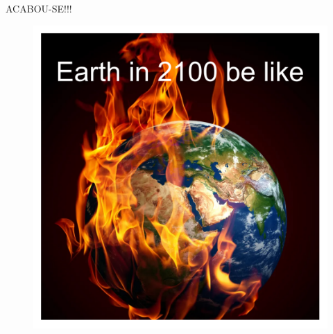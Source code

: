 \documentclass{beamer}
\begin{document}
\begin{frame}
\begin{center}
    \Huge ACABOU-SE!!!
\end{center}
\begin{figure}
    \centering
    \includegraphics[width=0.5\linewidth]{earth-2100-be-like.pdf}
\end{figure}
\end{frame}
\end{document}

